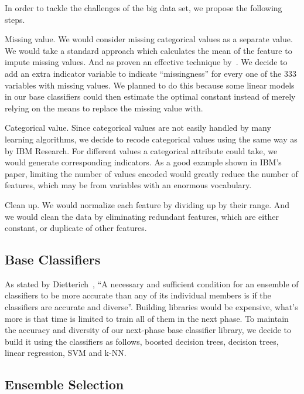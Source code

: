 \documentclass[journal]{IEEEtran}
\begin{document}
In order to tackle the challenges of the big data set, we propose the
following steps.
\par
Missing value. We would consider missing categorical values
as a separate value. We would take a standard approach which
calculates the mean of the feature to impute missing values. And as
proven an effective technique
by~\cite{Ref:WinningtheKDDCupIBMResearch}. We decide to add an extra
indicator variable to indicate “missingness” for every one of the 333
variables with missing values. We planned to do this because some
linear models in our base classifiers could then estimate the optimal
constant instead of merely relying on the means to replace the missing
value with. 
\par
Categorical value. Since categorical values are not easily
handled by many learning algorithms, we decide to recode categorical
values using the same way as by IBM Research. For different values a
categorical attribute could take, we would generate corresponding
indicators. As a good example shown in IBM’s paper, limiting the
number of values encoded would greatly reduce the number of features,
which may be from variables with an enormous vocabulary. 
\par
Clean up. We would normalize each feature by dividing up by their
range. And we would clean the data by eliminating redundant features,
which are either constant, or duplicate of other features.

\subsection{Base Classifiers}
\label{sec:base-classifiers}

As stated by Dietterich~\cite{Ref:EnsembleMethodsInMachineLearning},
``A necessary and sufficient condition for an ensemble of classifiers
to be more accurate than any of its individual members is if the
classifiers are accurate and diverse''. Building libraries would be
expensive, what’s more is that time is limited to train all of them in
the next phase. To maintain the accuracy and diversity of our
next-phase base classifier library, we decide to build it using the
classifiers as follows, boosted decision trees, decision trees, linear
regression, SVM and k-NN. 

\subsection{Ensemble Selection}
\label{sec:ensemble-selection}
\end{document}
